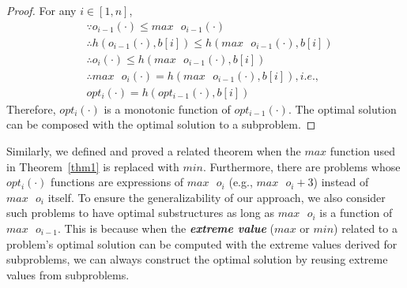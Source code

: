 \begin{proof}
For any $i\in[1, n]$, 
\begin{align}
    &\because o_{i-1}(\cdot) \le max \text{ }o_{i-1}(\cdot) \nonumber\\
    & \therefore h(o_{i-1}(\cdot), b[i])\le h(max \text{ }o_{i-1}(\cdot), b[i]) \nonumber\\
     &\therefore o_i(\cdot) \le h(max \text{ }o_{i-1}(\cdot), b[i])\nonumber\\ %
     &\therefore max\text{ }o_i(\cdot)=h(max \text{ }o_{i-1}(\cdot), b[i]), i.e.,  \nonumber \\
     & opt_i(\cdot)=h(opt_{i-1}(\cdot), b[i]) \nonumber
\end{align}
Therefore, $opt_i(\cdot)$ is a monotonic function of $opt_{i-1}(\cdot)$. The optimal solution can be composed with the optimal solution to a subproblem. \qedhere  
\end{proof}
Similarly, we defined and proved a related theorem when the $max$ function used in Theorem~\ref{thm1} is replaced with $min$. Furthermore, there are problems whose $opt_i(\cdot)$ functions are expressions of $max\text{ }o_i$ (e.g., $max\text{ }o_i+3$) instead of $max\text{ }o_i$ itself. 
To ensure the generalizability of our approach, we also consider such problems 
to have optimal substructures as long as $max\text{ }o_i$ is a function of $max\text{ }o_{i-1}$. 
This is because when the \textbf{\emph{extreme value}} ($max$ or $min$) related to a problem's optimal solution can be computed 
with the extreme values derived for subproblems,
we can always construct the optimal solution by reusing extreme values from subproblems. 

